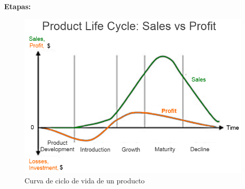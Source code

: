 \textbf{Etapas:}
\begin{figure}[htbp]
    \centering
    \includegraphics[width=12cm]{./../__Imagenes__/2020-02-27_00.png}
    \caption{Curva de ciclo de vida de un producto}
    \label{}
\end{figure}
